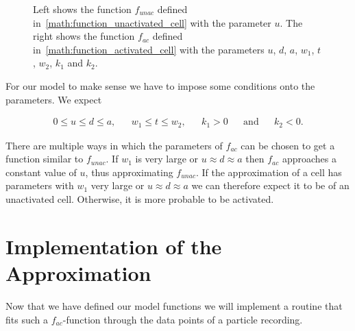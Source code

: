 \begin{figure}[h]
\begin{subfigure}{0.45\linewidth}
	\end{subfigure}
	
	\caption{Left shows the function $f_{unac}$ defined in~\ref{math:function_unactivated_cell} with the parameter $u$. The right shows the function $f_{ac}$ defined in~\ref{math:function_activated_cell} with the parameters $u$, $d$, $a$, $w_1$, $t$, $w_2$, $k_1$ and $k_2$.}
	\label{fig:typical_time_series_with_parameters}
\end{figure}

For our model to make sense we have to impose some conditions onto the parameters. We expect

\begin{align*}
	0 \leq u \leq d \leq a, && w_1 \leq t \leq w_2, && k_1 > 0 && \text{and} && k_2 < 0.
\end{align*}

There are multiple ways in which the parameters of $f_{ac}$ can be chosen to get a function similar to $f_{unac}$. If $w_1$ is very large or $u \approx d \approx a$ then $f_{ac}$ approaches a constant value of $u$, thus approximating $f_{unac}$. If the approximation of a cell has parameters with $w_1$ very large or $u \approx d \approx a$ we can therefore expect it to be of an unactivated cell. Otherwise, it is more probable to be activated.

\section{Implementation of the Approximation}

Now that we have defined our model functions we will implement a routine that fits such a $f_{ac}$-function through the data points of a particle recording.

